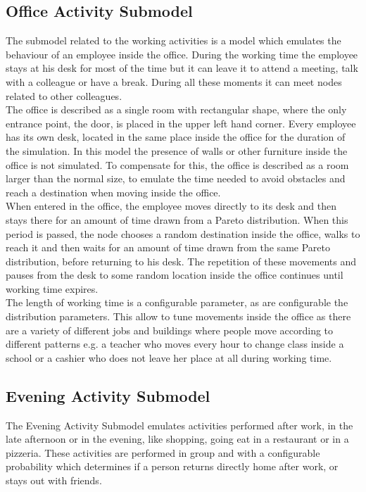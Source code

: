 \subsection{Office Activity Submodel}
The submodel related to the working activities is a model which emulates the behaviour of an employee inside the office. During the working time the employee stays at his desk for most of the time but it can leave it to attend a meeting, talk with a colleague or have a break. During all these moments it can meet nodes related to other colleagues.
\\

The office is described as a single room with rectangular shape, where the only entrance point, the door, is placed in the upper left hand corner. Every employee has its own desk, located in the same place inside the office for the duration of the simulation. In this model the presence of walls or other furniture inside the office is not simulated. To compensate for this, the office is described as a room larger than the normal size, to emulate the time needed to avoid obstacles and reach a destination when moving inside the office.
\\

When entered in the office, the employee moves directly to its desk and then stays there for an amount of time drawn from a Pareto distribution. When this period is passed, the node chooses a random destination inside the office, walks to reach it and then waits for an amount of time drawn from the same Pareto distribution, before returning to his desk. The repetition of these movements and pauses from the desk to some random location inside the office continues until working time expires. 
\\

The length of working time is a configurable parameter, as are configurable the distribution parameters. This allow to tune movements inside the office as there are a variety of different jobs and buildings where people move according to different patterns e.g. a teacher who moves every hour to change class inside a school or a cashier who does not leave her place at all during working time.


\subsection{Evening Activity Submodel}
The Evening Activity Submodel emulates activities performed after work, in the late afternoon or in the evening, like shopping, going eat in a restaurant or in a pizzeria. These activities are performed in group and with a configurable probability which determines if a person returns directly home after work, or stays out with friends.
\\

